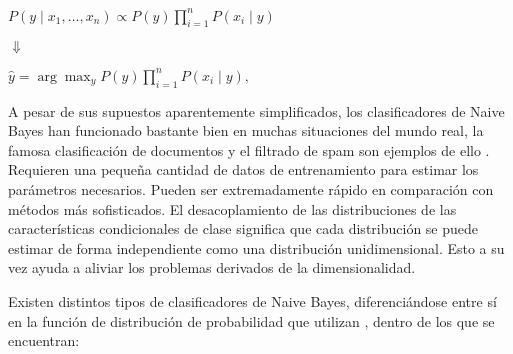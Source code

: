 \begin{center}
	$P(y \mid x_1, \dots, x_n) \propto P(y) \prod_{i=1}^{n} P(x_i \mid y)$
	
\end{center}

\begin{center}
	$\Downarrow$ 
\end{center}
\begin{center}
	$\hat{y} = \arg\max_y P(y) \prod_{i=1}^{n} P(x_i \mid y),$
\end{center}

A pesar de sus supuestos aparentemente simplificados, los clasificadores de Naive Bayes han funcionado bastante bien en muchas situaciones del mundo real, la famosa clasificación de documentos y el filtrado de spam son ejemplos de ello \cite{10.1007/BFb0026666, Chen2009, metsis2006spam}. Requieren una pequeña cantidad de datos de entrenamiento para estimar los parámetros necesarios. Pueden ser extremadamente rápido en comparación con métodos más sofisticados. El desacoplamiento de las distribuciones de las características condicionales de clase significa que cada distribución se puede estimar de forma independiente como una distribución unidimensional. Esto a su vez ayuda a aliviar los problemas derivados de la dimensionalidad. 

Existen distintos tipos de clasificadores de Naive Bayes, diferenciándose entre sí en la función de distribución de probabilidad que utilizan \cite{metsis2006spam,john1995estimating,manning2010introduction}, dentro de los que se encuentran:

